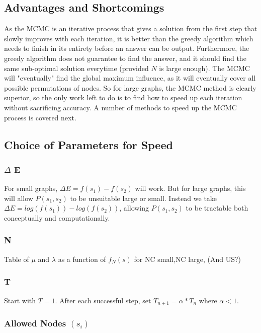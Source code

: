 \documentclass{article}
\begin{document}
	\subsection{Advantages and Shortcomings}
	
	As the MCMC is an iterative process that gives a solution from the first step that slowly improves with each iteration, it is better than the greedy algorithm which needs to finish in its entirety before an answer can be output. Furthermore, the greedy algorithm does not guarantee to find the answer, and it should find the same sub-optimal solution everytime (provided $N$ is large enough). The MCMC will "eventually" find the global maximum influence, as it will eventually cover all possible permutations of nodes. So for large graphs, the MCMC method is clearly superior, so the only work left to do is to find how to speed up each iteration without sacrificing accuracy. A number of methods to speed up the MCMC process is covered next.
	
	\subsection{Choice of Parameters for Speed}
	
	\subsubsection{$\Delta$ E}
	
	For small graphs, $\Delta E = f(s_1) - f(s_2)$ will work. But for large graphs, this will allow $P(s_1,s_2)$ to be unsuitable large or small. Instead we take $\Delta E = log(f(s_1)) - log(f(s_2))$, allowing $P(s_1,s_2)$ to be tractable both conceptually and computationally.
	
	\subsubsection{N}
	
	Table of $\mu$ and $\lambda$ as a function of $f_N(s)$ for NC small,NC large, (And US?)
	
	\subsubsection{T}
	
	Start with $T = 1$. After each successful step, set $T_{n+1} = \alpha*T_n$ where $\alpha < 1$.

	\subsubsection{Allowed Nodes $(s_i)$}
	
\end{document}
